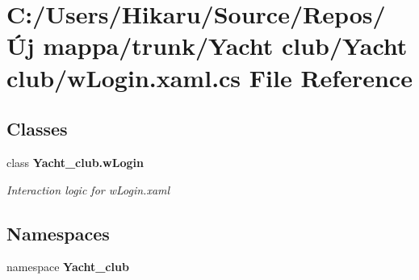 \section{C\+:/\+Users/\+Hikaru/\+Source/\+Repos/Új mappa/trunk/\+Yacht club/\+Yacht club/w\+Login.xaml.\+cs File Reference}
\label{w_login_8xaml_8cs}
\subsection*{Classes}
\begin{DoxyCompactItemize}
\item 
class \textbf{ Yacht\+\_\+club.\+w\+Login}
\begin{DoxyCompactList}\small\item\em Interaction logic for w\+Login.\+xaml \end{DoxyCompactList}\end{DoxyCompactItemize}
\subsection*{Namespaces}
\begin{DoxyCompactItemize}
\item 
namespace \textbf{ Yacht\+\_\+club}
\end{DoxyCompactItemize}
